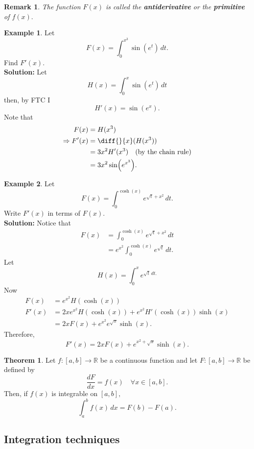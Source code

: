 \documentclass[12pt, a4paper]{article}
\newcommand{\imply}{\Rightarrow}
\newtheorem*{remark}{Remark}
\theoremstyle{definition}
\newtheorem{theorem}{Theorem}[section]
\newtheorem*{example}{Example}
\theoremstyle{plain}
\begin{document}
\begin{remark}
The function $F(x)$ is called the \textbf{antiderivative} or the \textbf{primitive} of $f(x).$
\end{remark}

\begin{example}
Let $$F(x)=\int_0^{x^3} \sin(e^t)\, dt.$$ Find $F'(x).$ \\
\textbf{Solution:} Let $$H(x) = \int_0^x \sin(e^t) \, dt$$ then, by FTC I $$H'(x)=\sin(e^x).$$ Note that $$\begin{aligned}
F(x)&=H(x^3) \\
\imply F'(x)&=\diff{}{x}(H(x^3)) \\
 		&= 3x^2 H'(x^3) \quad \text{(by the chain rule)}\\
 		&= 3x^2 \sin(e^{x^3}).
\end{aligned}$$ 

\end{example}

\begin{example}
Let $$F(x)=\int_0^{\cosh(x)} e^{\sqrt{t}+x^2} \, dt.$$ Write $F'(x)$ in terms of $F(x).$ \\
\textbf{Solution:} Notice that $$\begin{aligned}
F(x)&= \int_0^{\cosh(x)} e^{\sqrt{t}+x^2} \, dt \\
	&= e^{x^2}\int_0^{\cosh(x)} e^{\sqrt{t}} \, dt.
\end{aligned}$$ Let $$H(x)=\int_0^x e^{\sqrt{t} \, dt.}$$ Now $$\begin{aligned}
F(x)&=e^{x^2}H(\cosh(x)) \\
F'(x)&=2xe^{x^2}H(\cosh(x))+e^{x^2}H'(\cosh(x))\sinh(x) \\
	&= 2xF(x)+e^{x^2}e^{\sqrt{x}}\sinh(x).
\end{aligned}$$ Therefore, $$F'(x)=2xF(x)+e^{x^2+\sqrt{x}}\sinh(x).$$
\end{example}

\begin{theorem}
Let $f:[a,b]\rightarrow \mathbb{R}$ be a continuous function and let $F:[a,b] \rightarrow \mathbb{R}$ be defined by $$\frac{dF}{dx}=f(x) \quad \forall x \in [a,b].$$ Then, if $f(x)$ is integrable on $[a,b],$ $$\int_{a}^{b} f(x) \, dx= F(b)-F(a).$$
\end{theorem}

\subsection{Integration techniques}
\end{document}
